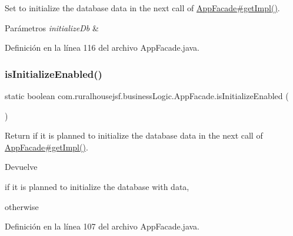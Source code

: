 Set to initialize the database data in the next call of \mbox{\hyperlink{classcom_1_1ruralhousejsf_1_1business_logic_1_1_app_facade_a029bcceee98b9070b9f80abc54db45d6}{App\+Facade\#get\+Impl()}}.


\begin{DoxyParams}{Parámetros}
{\em initialize\+Db} & \\
\hline
\end{DoxyParams}


Definición en la línea 116 del archivo App\+Facade.\+java.

\mbox{\label{classcom_1_1ruralhousejsf_1_1business_logic_1_1_app_facade_a0486115e3ba238d025e23ec62548b3bc}} 
\subsubsection{\texorpdfstring{isInitializeEnabled()}{isInitializeEnabled()}}
{\footnotesize\ttfamily static boolean com.\+ruralhousejsf.\+business\+Logic.\+App\+Facade.\+is\+Initialize\+Enabled (\begin{DoxyParamCaption}{ }\end{DoxyParamCaption})\hspace{0.3cm}{\ttfamily [static]}}

Return if it is planned to initialize the database data in the next call of \mbox{\hyperlink{classcom_1_1ruralhousejsf_1_1business_logic_1_1_app_facade_a029bcceee98b9070b9f80abc54db45d6}{App\+Facade\#get\+Impl()}}.

\begin{DoxyReturn}{Devuelve}

\begin{DoxyCode}{0}
\DoxyCodeLine{\textcolor{keyword}{true} }
\end{DoxyCode}
 if it is planned to initialize the database with data,
\begin{DoxyCode}{0}
\DoxyCodeLine{\textcolor{keyword}{false} }
\end{DoxyCode}
 otherwise 
\end{DoxyReturn}


Definición en la línea 107 del archivo App\+Facade.\+java.

